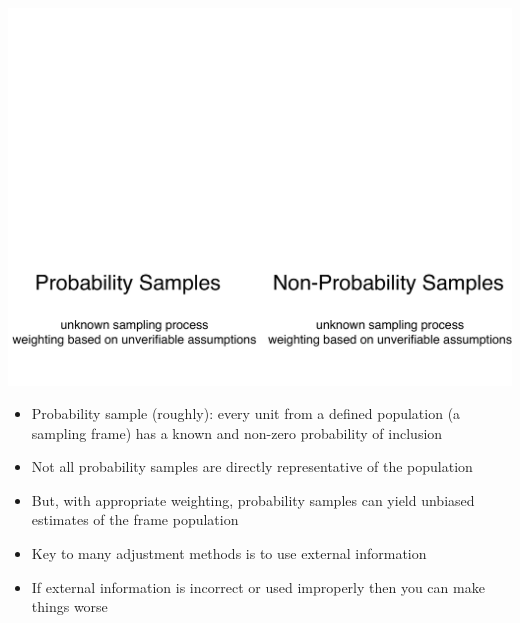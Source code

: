 \documentclass[aspectratio=169]{beamer}
\begin{document}
\begin{frame}

\vspace{-2.5in}
\begin{center}
\includegraphics[width=\textwidth]{figures/prob_vs_nonprob_new}
\end{center}

\end{frame}
\begin{frame}

\begin{itemize}
\item Probability sample (roughly): every unit from a defined population (a sampling frame) has a known and non-zero probability of inclusion
\pause
\item Not all probability samples are directly representative of the population
\pause
\item But, with appropriate weighting, probability samples can yield unbiased estimates of the frame population
\end{itemize}

\end{frame}
\begin{frame}

\begin{itemize}
\item Key to many adjustment methods is to use external information
\pause
\item If external information is incorrect or used improperly then you can make things worse
\end{itemize}

\end{frame}
\end{document}
